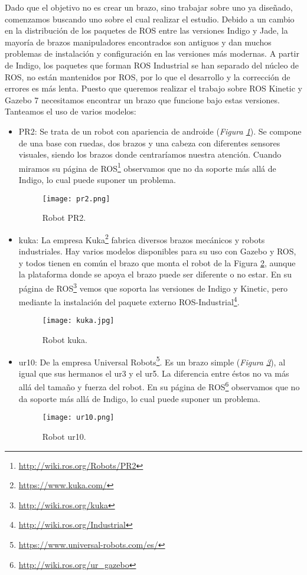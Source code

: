 Dado que el objetivo no es crear un brazo, sino trabajar sobre uno ya diseñado, comenzamos buscando uno sobre el cual realizar el estudio. Debido a un cambio en la distribución de los paquetes de ROS entre las versiones Indigo y Jade, la mayoría de brazos manipuladores encontrados son antiguos y dan muchos problemas de instalación y configuración en las versiones más modernas. A partir de Indigo, los paquetes que forman ROS Industrial se han separado del núcleo de ROS, no están mantenidos por ROS, por lo que el desarrollo y la corrección de errores es más lenta. Puesto que queremos realizar el trabajo sobre ROS Kinetic y Gazebo 7 necesitamos encontrar un brazo que funcione bajo estas versiones. Tanteamos el uso de varios modelos:
\begin{itemize}
	\item PR2: Se trata de un robot con apariencia de androide (\textit{Figura \ref{fig:pr2}}). Se compone de una base con ruedas, dos brazos y una cabeza con diferentes sensores visuales, siendo los brazos donde centraríamos nuestra atención. Cuando miramos su página de ROS\footnote{\url{http://wiki.ros.org/Robots/PR2}} observamos que no da soporte más allá de Indigo, lo cual puede suponer un problema.
	\begin{figure}[h]
		\centering\texttt{[image: pr2.png]}
		\caption{Robot PR2.}
		\label{fig:pr2}
	\end{figure}
	\item kuka: La empresa Kuka\footnote{\url{https://www.kuka.com/}} fabrica diversos brazos mecánicos y robots industriales. Hay varios modelos disponibles para su uso con Gazebo y ROS, y todos tienen en común el brazo que monta el robot de la Figura \ref{fig:kuka}, aunque la plataforma donde se apoya el brazo puede ser diferente o no estar. En su página de ROS\footnote{\url{http://wiki.ros.org/kuka}} vemos que soporta las versiones de Indigo y Kinetic, pero mediante la instalación del paquete externo ROS-Industrial\footnote{\url{http://wiki.ros.org/Industrial}}.
	\begin{figure}[h]
		\centering\texttt{[image: kuka.jpg]}
		\caption{Robot kuka.}
		\label{fig:kuka}
	\end{figure}
	\item ur10: De la empresa Universal Robots\footnote{\url{https://www.universal-robots.com/es/}}. Es un brazo simple (\textit{Figura \ref{fig:ur10}}), al igual que sus hermanos el ur3 y el ur5. La diferencia entre éstos no va más allá del tamaño y fuerza del robot. En su página de ROS\footnote{\url{http://wiki.ros.org/ur_gazebo}} observamos que no da soporte más allá de Indigo, lo cual puede suponer un problema.
	\begin{figure}[h]
		\centering\texttt{[image: ur10.png]}
		\caption{Robot ur10.}
		\label{fig:ur10}
	\end{figure}
\end{itemize}


